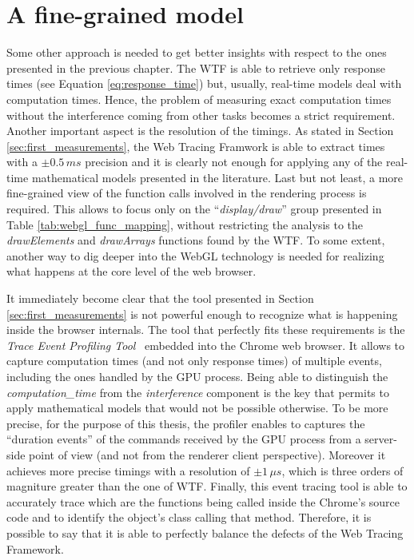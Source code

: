 \section{A fine-grained model}
Some other approach is needed to get better insights with respect to the ones
presented in the previous chapter. The WTF is able to retrieve only response
times (see Equation \ref{eq:response_time}) but, usually, real-time models
deal with computation times.
Hence, the problem of measuring exact computation
times without the interference coming from other tasks becomes a strict requirement.
Another important aspect is the resolution of the timings. As stated in Section
\ref{sec:first_measurements}, the Web Tracing Framwork is able to extract times with a
\( \pm 0.5\,ms \) precision and it is clearly not enough for applying any of
the real-time mathematical models presented in the literature.
Last but not least, a more fine-grained view of the function calls involved in
the rendering process is required. This allows to focus only on the
``\emph{display/draw}'' group presented in Table \ref{tab:webgl_func_mapping},
without restricting the analysis to the \emph{drawElements} and \emph{drawArrays}
functions found by the WTF. To some extent, another way to dig deeper into the
WebGL technology is needed for realizing what happens at the core level of the
web browser.

It immediately become clear that the tool presented in Section \ref{sec:first_measurements}
is not powerful enough to recognize what is happening inside the browser internals.
The tool that perfectly fits these requirements is the \emph{Trace Event Profiling
Tool}~\cite{eventprofilertool} embedded into the Chrome web browser.
It allows to capture computation times (and not only response times) of multiple
events, including the ones handled by the GPU process. Being able to distinguish
the \emph{computation\_time} from the \emph{interference} component is the key
that permits to apply mathematical models that would not be possible otherwise.
To be more precise, for the purpose of this thesis,
the profiler enables to captures the ``duration events'' of the commands received by the GPU
process from a server-side point of view (and not from the renderer client perspective).
Moreover it achieves more precise timings with a resolution of \(\pm 1\,\mu s\),
which is three orders of magniture greater than the one of WTF.
Finally, this event tracing tool is able to accurately trace which are the functions
being called inside the Chrome's source code and to identify the object's class
calling that method. Therefore, it is possible to say that it is able to perfectly
balance the defects of the Web Tracing Framework.

